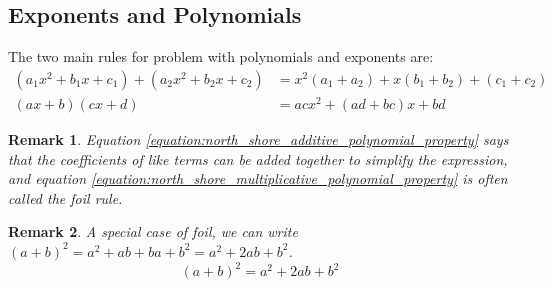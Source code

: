 \documentclass[oneside]{book}
\theoremstyle{mystyle}
\newtheorem{remark}{Remark}[section]
\begin{document}
\subsection{Exponents and Polynomials}
The two main rules for problem with polynomials and exponents are:
\begin{align}
    (a_1 x^2 + b_1 x + c_1) + (a_2 x^2 + b_2 x + c_2) &= x^2(a_1+a_2) + x (b_1+b_2) + (c_1+c_2)\label{equation:north_shore_additive_polynomial_property}\\
    (ax+b)(cx+d) &= acx^2 + (ad+bc)x + bd\label{equation:north_shore_multiplicative_polynomial_property}
\end{align}
\begin{remark}
Equation \ref{equation:north_shore_additive_polynomial_property} says that the coefficients of like terms can be added together to simplify the expression, and equation \ref{equation:north_shore_multiplicative_polynomial_property} is often called the \gls{foil} rule.
\end{remark}
\begin{remark}
\label{remark:north_shore_square_of_a_sum_foil}
A special case of \gls{foil}, we can write $(a+b)^2 = a^2+ab+ba+b^2 = a^2+2ab+b^2$.
\begin{equation}
\label{equation:North_Shore_square_of_a_sum}
    (a+b)^2 = a^2+2ab+b^2
\end{equation}
\end{remark}
\end{document}
